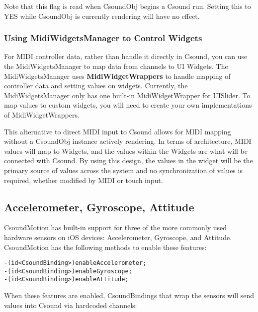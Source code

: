 \documentclass[11pt]{article}
\begin{document}
Note that this flag is read when CsoundObj begins a Csound run.  Setting this to YES while CsoundObj is currently rendering will have no effect.

\subsubsection{Using MidiWidgetsManager to Control Widgets}

For MIDI controller data, rather than handle it directly in Csound, you can use the MidiWidgetsManager to map data from channels to UI Widgets.  The MidiWidgetsManager uses \textbf{MidiWidgetWrappers} to handle mapping of controller data and setting values on widgets.  Currently, the MidiWidgetsManager only has one built-in MidiWidgetWrapper for UISlider. To map values to custom widgets, you will need to create your own implementations of MidiWidgetWrappers.

This alternative to direct MIDI input to Csound allows for MIDI mapping without a CsoundObj instance actively rendering. In terms of architecture, MIDI values will map to Widgets, and the values within the Widgets are what will be connected with Csound.  By using this design, the values in the widget will be the primary source of values across the system and no synchronization of values is required, whether modified by MIDI or touch input.

\subsection{Accelerometer, Gyroscope, Attitude}

CsoundMotion has built-in support for three of the more commonly used hardware sensors on iOS devices: Accelerometer, Gyroscope, and Attitude. CsoundMotion has the following methods to enable these features:


\begin{lstlisting}[caption=CsoundMotion Hardware Sensor Methods]
-(id<CsoundBinding>)enableAccelerometer;
-(id<CsoundBinding>)enableGyroscope;
-(id<CsoundBinding>)enableAttitude;
\end{lstlisting}

When these features are enabled, CsoundBindings that wrap the sensors will send values into Csound via hardcoded channels:
\end{document}
